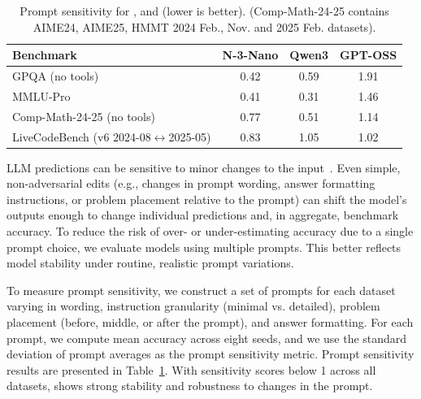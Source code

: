 \begin{table}[!htp]
\centering
\small
\setlength{\tabcolsep}{7pt}
\renewcommand{\arraystretch}{1.15}

\begin{tabular}{l|c c c }
\toprule
\textbf{Benchmark} & \textbf{N-3-Nano} & \textbf{Qwen3} & \textbf{GPT-OSS} \\
\midrule

GPQA (no tools) & 0.42 & 0.59 & 1.91 \\
MMLU-Pro & 0.41 & 0.31 & 1.46 \\
Comp-Math-24-25 (no tools) & 0.77 & 0.51 & 1.14 \\
LiveCodeBench (v6 2024-08$\leftrightarrow$2025-05) & 0.83 & 1.05 & 1.02\\
\bottomrule
\end{tabular}

\caption{
Prompt sensitivity for \ourmodel,  and  (lower is better). (Comp-Math-24-25 contains AIME24, AIME25, HMMT 2024 Feb., Nov. and 2025 Feb. datasets).
}
\label{tab:prompt_sensitivty}
\end{table}

LLM predictions can be sensitive to minor changes to the input~\citep{nalbandyan2025score}. Even simple, non-adversarial edits (e.g., changes in prompt wording, answer formatting instructions, or problem placement relative to the prompt) can shift the model’s outputs enough to change individual predictions and, in aggregate, benchmark accuracy. To reduce the risk of over- or under-estimating accuracy due to a single prompt choice, we evaluate models using multiple prompts. This better reflects model stability under routine, realistic prompt variations.

To measure prompt sensitivity, we construct a set of prompts for each dataset varying in wording, instruction granularity (minimal vs. detailed), problem placement (before, middle, or after the prompt), and answer formatting. For each prompt, we compute mean accuracy across eight seeds, and we use the standard deviation of prompt averages as the prompt sensitivity metric. Prompt sensitivity results are presented in Table~\ref{tab:prompt_sensitivty}. With sensitivity scores below 1 across all datasets, \ourmodel shows strong stability and robustness to changes in the prompt.




    

